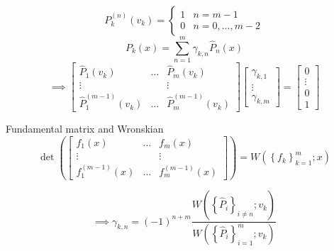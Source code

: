 \documentclass{beamer}
\newcommand{\set}[1]{\left \{ #1 \right \}}
\newcommand{\W}[2]{W \left ( #1 ; #2 \right )}
\begin{document}
\begin{frame}
\begin{equation*}
P_k^{(n)}(v_k) = \begin{cases} 1 & n = m-1 \\ 0 & n = 0,...,m-2 \end{cases}
\end{equation*}
\begin{equation*}
P_k(x) = \sum_{n=1}^m \gamma_{k,n} \hat{P}_n(x)
\end{equation*}
\begin{equation*}
\implies \begin{bmatrix} \hat{P}_1(v_k) & \dots & \hat{P}_m(v_k) \\ \vdots & & \vdots \\ \hat{P}_1^{(m-1)}(v_k) & \dots & \hat{P}_m^{(m-1)}(v_k) \end{bmatrix} \begin{bmatrix} \gamma_{k,1} \\ \vdots \\ \gamma_{k,m} \end{bmatrix} = \begin{bmatrix} 0 \\ \vdots \\ 0 \\ 1 \end{bmatrix}
\end{equation*}
\end{frame}

\begin{frame}
\begin{block}{Fundamental matrix and Wronskian}
\begin{equation*}
\det \left ( \begin{bmatrix} f_1(x) & \dots & f_m(x) \\ \vdots & & \vdots \\ f_1^{(m-1)}(x) & \dots & f_m^{(m-1)}(x) \end{bmatrix} \right ) = \W{\set{f_k}_{k=1}^m}{x}
\end{equation*}
\end{block}
\begin{equation*}
\implies \gamma_{k,n} = (-1)^{n+m} \frac{ \W{\set{\hat{P}_i}_{i \neq n}}{v_k} }{ \W{\set{\hat{P}_i}_{i=1}^m}{v_k} }
\end{equation*}
\end{frame}
\end{document}

